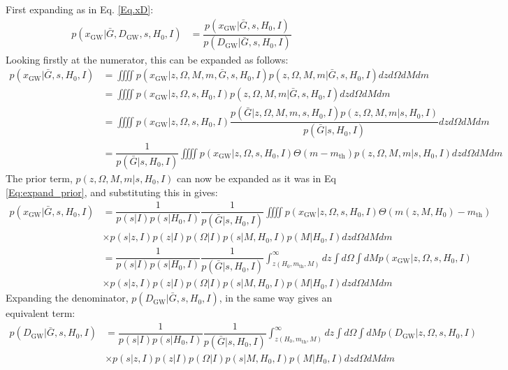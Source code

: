 \documentclass[a4paper,10pt]{article}
\begin{document}
First expanding as in Eq. \ref{Eq.xD}:
\begin{equation}
\label{Eq:px_H0GbarD}
\begin{aligned}
p(x_{\text{GW}}|\bar{G},D_{\text{GW}},s,H_0,I) &= \dfrac{p(x_{\text{GW}}|\bar{G},s,H_0,I)}{p(D_{\text{GW}}|\bar{G},s,H_0,I)}
\end{aligned}
\end{equation}
Looking firstly at the numerator, this can be expanded as follows:
\begin{equation}
\begin{aligned}
p(x_{\text{GW}}|\bar{G},s,H_0,I) &= \iiiint p(x_{\text{GW}}|z,\Omega,M,m,\bar{G},s,H_0,I) p(z,\Omega,M,m|\bar{G},s,H_0,I) dz d\Omega dM dm
\\&= \iiiint p(x_{\text{GW}}|z,\Omega,s,H_0,I) p(z,\Omega,M,m|\bar{G},s,H_0,I) dz d\Omega dM dm
\\ &= \iiiint p(x_{\text{GW}}|z,\Omega,s,H_0,I) \dfrac{p(\bar{G}|z,\Omega,M,m,s,H_0,I)p(z,\Omega,M,m|s,H_0,I)}{p(\bar{G}|s,H_0,I)} dz d\Omega dM dm
\\ &= \dfrac{1}{p(\bar{G}|s,H_0,I)}\iiiint p(x_{\text{GW}}|z,\Omega,s,H_0,I) \Theta(m-m_{\text{th}})p(z,\Omega,M,m|s,H_0,I) dz d\Omega dM dm
\end{aligned}
\end{equation}
The prior term, $p(z,\Omega,M,m|s,H_0,I)$ can now be expanded as it was in Eq \ref{Eq:expand_prior}, and substituting this in gives:
\begin{equation}
\begin{aligned}
p(x_{\text{GW}}|\bar{G},s,H_0,I) &=\dfrac{1}{p(s|I)p(s|H_0,I)} \dfrac{1}{p(\bar{G}|s,H_0,I)}\iiiint p(x_{\text{GW}}|z,\Omega,s,H_0,I) \Theta(m(z,M,H_0)-m_{\text{th}}) \\&\times p(s|z,I)p(z|I)p(\Omega|I)p(s|M,H_0,I)p(M|H_0,I) dz d\Omega dM dm
\\&=\dfrac{1}{p(s|I)p(s|H_0,I)} \dfrac{1}{p(\bar{G}|s,H_0,I)}\int^\infty_{z(H_0,m_{\text{th}},M)}dz \int d\Omega \int dM p(x_{\text{GW}}|z,\Omega,s,H_0,I) \\&\times p(s|z,I)p(z|I)p(\Omega|I)p(s|M,H_0,I)p(M|H_0,I) dz d\Omega dM dm
\end{aligned}
\end{equation}
Expanding the denominator, $p(D_{\text{GW}}|\bar{G},s,H_0,I)$, in the same way gives an equivalent term:
\begin{equation}
\begin{aligned}
p(D_{\text{GW}}|\bar{G},s,H_0,I) &=\dfrac{1}{p(s|I)p(s|H_0,I)} \dfrac{1}{p(\bar{G}|s,H_0,I)}\int^\infty_{z(H_0,m_{\text{th}},M)}dz \int d\Omega \int dM p(D_{\text{GW}}|z,\Omega,s,H_0,I) \\&\times p(s|z,I)p(z|I)p(\Omega|I)p(s|M,H_0,I)p(M|H_0,I) dz d\Omega dM dm
\end{aligned}
\end{equation}
\end{document}
